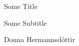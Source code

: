\documentclass{article}
\begin{document}
\centerline{\huge Some Title }
\centerline{\large Some Subtitle }
\centerline{\small Donna Hermannsdóttir}
\pagebreak
\end{document}
